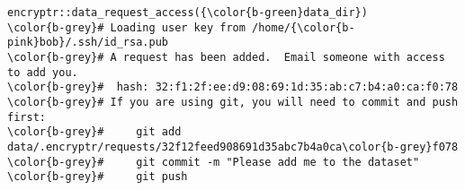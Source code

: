 \documentclass[class=minimal,border=0]{standalone}
\begin{document}
%
\begin{BVerbatim}[bgcolor=b-darkgrey]
encryptr::data_request_access({\color{b-green}data_dir})
\color{b-grey}# Loading user key from /home/{\color{b-pink}bob}/.ssh/id_rsa.pub
\color{b-grey}# A request has been added.  Email someone with access to add you.
\color{b-grey}#  hash: 32:f1:2f:ee:d9:08:69:1d:35:ab:c7:b4:a0:ca:f0:78
\color{b-grey}# If you are using git, you will need to commit and push first:
\color{b-grey}#     git add data/.encryptr/requests/32f12feed908691d35abc7b4a0ca\color{b-grey}f078
\color{b-grey}#     git commit -m "Please add me to the dataset"
\color{b-grey}#     git push
\end{BVerbatim}
\end{document}
